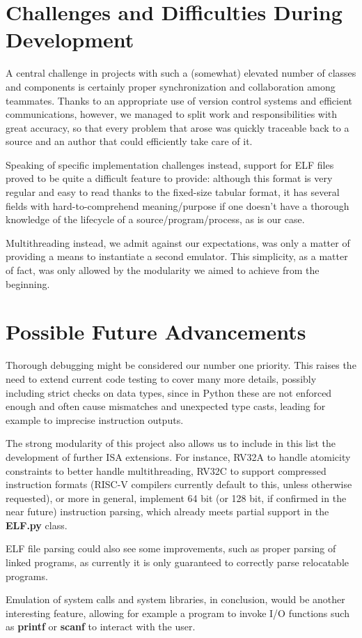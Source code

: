 \documentclass[12pt]{article}
\begin{document}
\section{Challenges and Difficulties During Development}
A central challenge in projects with such a (somewhat) elevated number of classes and components is certainly proper synchronization and collaboration among teammates. Thanks to an appropriate use of version control systems and efficient communications, however, we managed to split work and responsibilities with great accuracy, so that every problem that arose was quickly traceable back to a source and an author that could efficiently take care of it.

Speaking of specific implementation challenges instead, support for ELF files proved to be quite a difficult feature to provide: although this format is very regular and easy to read thanks to the fixed-size tabular format, it has several fields with hard-to-comprehend meaning/purpose if one doesn’t have a thorough knowledge of the lifecycle of a source/program/process, as is our case.

Multithreading instead, we admit against our expectations, was only a matter of providing a means to instantiate a second emulator. This simplicity, as a matter of fact, was only allowed by the modularity we aimed to achieve from the beginning.

\section{Possible Future Advancements}
Thorough debugging might be considered our number one priority. This raises the need to extend current code testing to cover many more details, possibly including strict checks on data types, since in Python these are not enforced enough and often cause mismatches and unexpected type casts, leading for example to imprecise instruction outputs.

The strong modularity of this project also allows us to include in this list the development of further ISA extensions. For instance, RV32A to handle atomicity constraints to better handle multithreading, RV32C to support compressed instruction formats (RISC-V compilers currently default to this, unless otherwise requested), or more in general, implement 64 bit (or 128 bit, if confirmed in the near future) instruction parsing, which already meets partial support in the \textbf{ELF.py} class.

ELF file parsing could also see some improvements, such as proper parsing of linked programs, as currently it is only guaranteed to correctly parse relocatable programs.

Emulation of system calls and system libraries, in conclusion, would be another interesting feature, allowing for example a program to invoke I/O functions such as \textbf{printf} or \textbf{scanf} to interact with the user.
\end{document}
